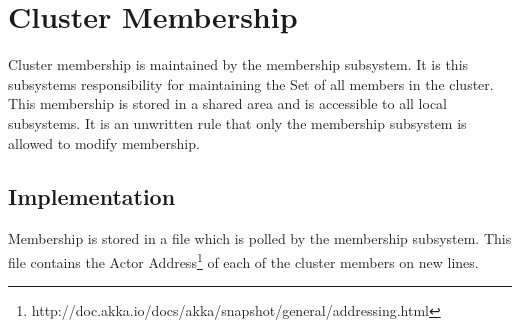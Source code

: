 \documentclass[11pt]{article}
\begin{document}
\section{Cluster Membership}
Cluster membership is maintained by the membership subsystem.  It is this subsystems responsibility for maintaining the Set of all members in the cluster.  This membership is stored in a shared area and is accessible to all local subsystems.  It is an unwritten rule that only the membership subsystem is allowed to modify membership.

\subsection{Implementation}
Membership is stored in a file which is polled by the membership subsystem. This file contains the Actor Address\footnote{http://doc.akka.io/docs/akka/snapshot/general/addressing.html} of each of the cluster members on new lines.
\end{document}
